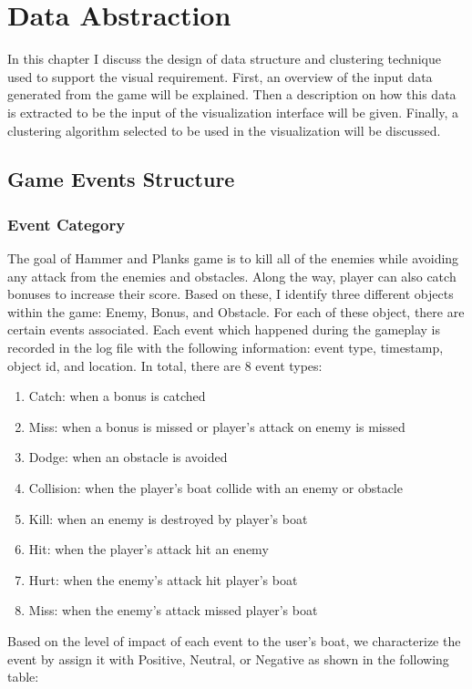 \chapter{Data Abstraction}

In this chapter I discuss the design of data structure and clustering technique used to support the visual requirement. First, an overview of the input data generated from the game will be explained. Then a description on how this data is extracted to be the input of the visualization interface will be given. Finally, a clustering algorithm selected to be used in the visualization will be discussed.

\section{Game Events Structure}
\subsection{Event Category}
The goal of Hammer and Planks game is to kill all of the enemies while avoiding any attack from the enemies and obstacles\cite{diloreto}. Along the way, player can also catch bonuses to increase their score. Based on these, I identify three different objects within the game: Enemy, Bonus, and Obstacle. For each of these object, there are certain events associated. Each event which happened during the gameplay is recorded in the log file with the following information: event type, timestamp, object id, and location. In total, there are 8 event types:
\newcommand{\events}[2]{$#1 _ #2$}	
\begin{enumerate}[label=({\arabic*})]
\item Catch: when a bonus is catched
\item Miss: when a bonus is missed or player's attack on enemy is missed
\item Dodge: when an obstacle is avoided
\item Collision: when the player's boat collide with an enemy or obstacle
\item Kill: when an enemy is destroyed by player's boat
\item Hit: when the player's attack hit an enemy
\item Hurt: when the enemy's attack hit player's boat
\item Miss: when the enemy's attack missed player's boat
\end{enumerate}

Based on the level of impact of each event to the user's boat, we characterize the event by assign it with Positive, Neutral, or Negative as shown in the following table:

